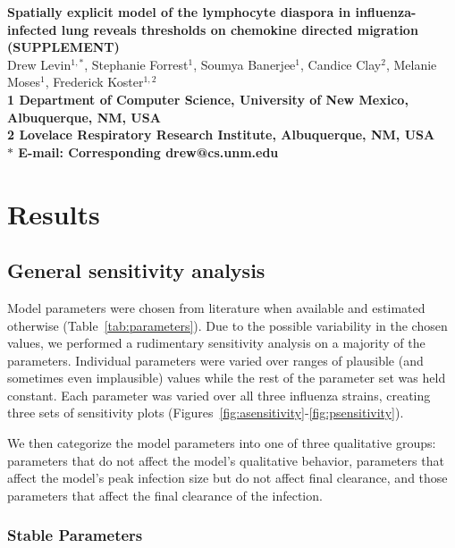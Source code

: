 \documentclass[10pt]{article}
\date{}
\begin{document}
\begin{flushleft}
{\Large
\textbf{Spatially explicit model of the lymphocyte diaspora in influenza-infected lung reveals thresholds on chemokine directed migration (SUPPLEMENT)}
}
\\
Drew Levin$^{1,\ast}$, 
Stephanie Forrest$^{1}$, 
Soumya Banerjee$^{1}$,
Candice Clay$^{2}$, 
Melanie Moses$^{1}$, 
Frederick Koster$^{1,2}$
\\
\bf{1} Department of Computer Science, University of New Mexico, Albuquerque, NM, USA
\\
\bf{2} Lovelace Respiratory Research Institute, Albuquerque, NM, USA
\\
$\ast$ E-mail: Corresponding drew@cs.unm.edu
\end{flushleft}



\section*{Results}

\subsection*{General sensitivity analysis}

Model parameters were chosen from literature when available and estimated otherwise (Table~\ref{tab:parameters}).  Due to the possible variability in the chosen values, we performed a rudimentary sensitivity analysis on a majority of the parameters.  Individual parameters were varied over ranges of plausible (and sometimes even implausible) values while the rest of the parameter set was held constant.  Each parameter was varied over all three influenza strains, creating three sets of sensitivity plots (Figures~\ref{fig:asensitivity}-\ref{fig:psensitivity}).

We then categorize the model parameters into one of three qualitative groups: parameters that do not affect the model's qualitative behavior, parameters that affect the model's peak infection size but do not affect final clearance, and those parameters that affect the final clearance of the infection.

\subsubsection*{Stable Parameters}
\end{document}
